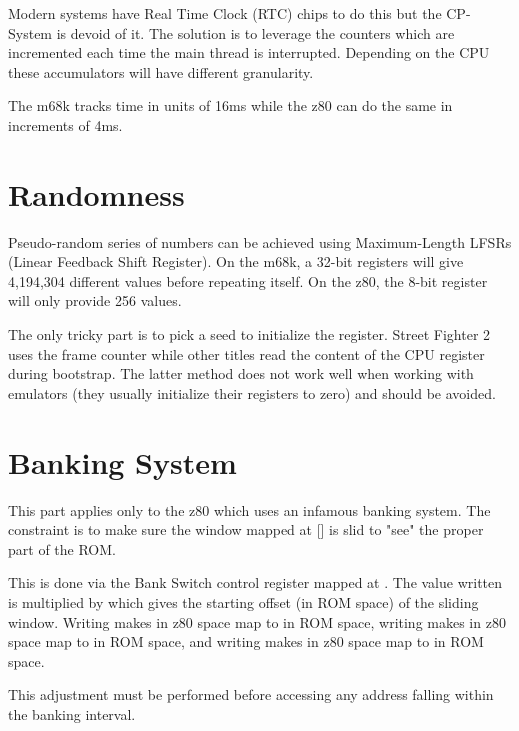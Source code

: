 Modern systems have Real Time Clock (RTC) chips to do this but the CP-System is devoid of it. The solution is to leverage the counters which are incremented each time the main thread is interrupted. Depending on the CPU these accumulators will have different granularity.

The m68k tracks time in units of 16ms while the z80 can do the same in increments of 4ms.


\section{Randomness}
Pseudo-random series of numbers can be achieved using Maximum-Length LFSRs (Linear Feedback Shift Register). On the m68k, a 32-bit registers will give 4,194,304 different values before repeating itself. On the z80, the 8-bit register will only provide 256 values.

The only tricky part is to pick a seed to initialize the register. Street Fighter 2 uses the frame counter while other titles read the content of the CPU register during bootstrap. The latter method does not work well when working with emulators (they usually initialize their registers to zero) and should be avoided.

\section{Banking System}
\label{memory_bank_programming}
This part applies only to the z80 which uses an infamous banking system. The constraint is to make sure the window mapped at [] is slid to "see" the proper part of the ROM. 

This is done via the Bank Switch control register mapped at . The value written is multiplied by  which gives the starting offset (in ROM space) of the sliding window. Writing  makes  in z80 space map to  in ROM space, writing  makes  in z80 space map to  in ROM space, and writing  makes  in z80 space map to  in ROM space.
 
This adjustment must be performed before accessing any address falling within the banking interval. 
